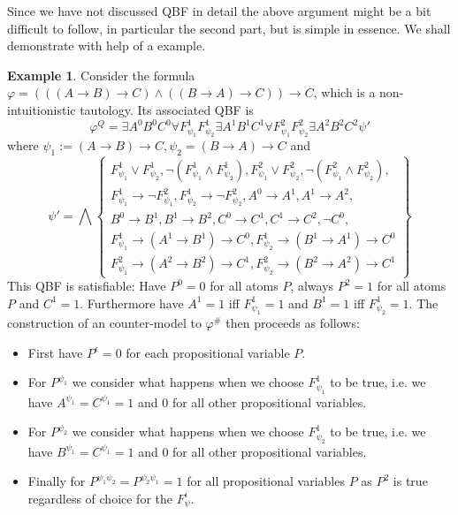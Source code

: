 \documentclass[a4paper,12pt]{report}
\theoremstyle{definition}
\theoremstyle{definition}
\theoremstyle{definition}
\theoremstyle{definition}
\theoremstyle{definition}
\theoremstyle{definition}
\newtheorem{example}[theorem]{Example}
\theoremstyle{definition}
\begin{document}
	Since we have not discussed QBF in detail the above argument might be a bit difficult to follow, in particular the second part, but is simple in essence. We shall demonstrate with help of a example.

	\begin{example}
		Consider the formula $\varphi = (((A\to B)\to C)\wedge((B\to A)\to C))\to C$, which is a non-intuitionistic tautology. Its associated QBF is $$\varphi^Q = \exists A^0B^0C^0\forall F_{\psi_1}^1F_{\psi_2}^1 \exists A^1B^1C^1\forall F_{\psi_1}^2F_{\psi_2}^2 \exists A^2B^2C^2\psi'$$where $\psi_1 := (A\to B)\to C, \psi_2 = (B\to A)\to C$ and $$\psi' = \bigwedge\left\{\begin{matrix}
			F^1_{\psi_1}\vee F^1_{\psi_2}, \neg(F^1_{\psi_1}\wedge F^1_{\psi_2}), F^2_{\psi_1}\vee F^2_{\psi_2},\neg(F^2_{\psi_1}\wedge F^2_{\psi_2}),\\F^1_{\psi_1}\to\neg F^2_{\psi_1},F^1_{\psi_2}\to\neg F^2_{\psi_2}, A^0\to A^1,A^1\to A^2, 
			\\B^0\to B^1, B^1\to B^2, C^0\to C^1, C^1\to C^2,\neg C^0, \\
			  F^1_{\psi_1}\to (A^1\to B^1)\to C^0, F^1_{\psi_2}\to(B^1\to A^1)\to C^0\\
			 F^2_{\psi_1}\to (A^2\to B^2)\to C^1, F^2_{\psi_2}\to(B^2\to A^2)\to C^1
		\end{matrix}\right\}$$
	This QBF is satisfiable: Have $P^0 = 0$ for all atoms $P$, always $P^2 = 1$ for all atoms $P$ and $C^1 = 1$. Furthermore have $A^1 = 1$ iff $F^1_{\psi_1} = 1$ and $B^1 = 1$ iff $F^1_{\psi_2} = 1$. The construction of an counter-model to $\varphi^\#$ then proceeds as follows:
	\begin{itemize}
		\item First have $P^\epsilon = 0$ for each propositional variable $P$.
		\item For $P^{\psi_1}$ we consider what happens when we choose $F^1_{\psi_1}$ to be true, i.e. we have $A^{\psi_1} = C^{\psi_1} = 1$ and $0$ for all other propositional variables.
		\item For $P^{\psi_2}$ we consider what happens when we choose $F^1_{\psi_2}$ to be true, i.e. we have $B^{\psi_1} = C^{\psi_1} = 1$ and $0$ for all other propositional variables.
		\item Finally for $P^{\psi_1\psi_2} = P^{\psi_2\psi_1} = 1$ for all propositional variables $P$ as $P^2$ is true regardless of choice for the $F^i_\psi$. 
	\end{itemize}
	\end{example}	
\end{document}
